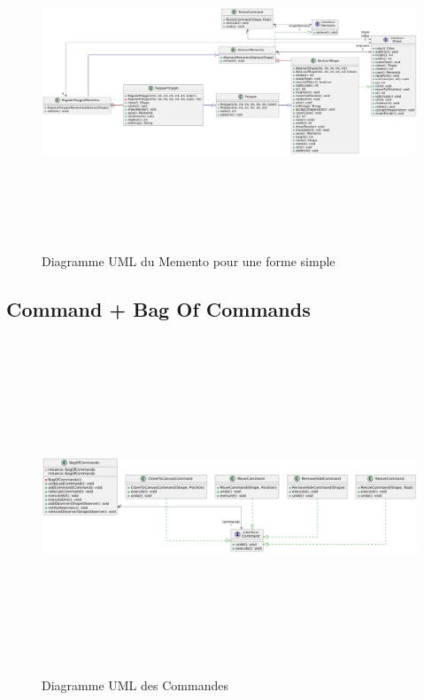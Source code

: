 \documentclass{article}
\begin{document}
\begin{figure}[h]
    \centering
    \includegraphics[width=\textwidth,height=10.0cm,keepaspectratio]{memento2.png}
    \caption{Diagramme UML du Memento pour une forme simple}
    \label{MementoShape}
\end{figure}
\FloatBarrier

\subsection{Command + Bag Of Commands} \label{BoC}

\begin{figure}[h]
    \centering
    \includegraphics[width=\textwidth,height=10.0cm,keepaspectratio]{command.png}
    \caption{Diagramme UML des Commandes}
    \label{Command}
\end{figure}
\FloatBarrier
\end{document}
